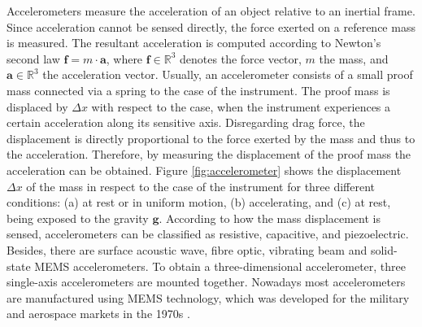Accelerometers measure the acceleration of an object relative to an inertial frame. Since acceleration cannot be sensed directly, the force exerted on a reference mass is measured. The resultant acceleration is computed according to Newton's second law $\mathbf{f} = m \cdot \mathbf{a}$, where $\mathbf{f} \in \mathbb{R}^3$ denotes the force vector, $m$ the mass, and $\mathbf{a} \in \mathbb{R}^3$ the acceleration vector. Usually, an accelerometer consists of a small proof mass connected via a spring to the case of the instrument. The proof mass is displaced  by $\Delta x$ with respect to the case, when the instrument experiences a certain acceleration along its sensitive axis. Disregarding drag force, the displacement is directly proportional to the force exerted by the mass and thus to the acceleration. Therefore, by measuring the displacement of the proof mass the acceleration can be obtained. Figure \ref{fig:accelerometer} shows the displacement $\Delta x$ of the mass in respect to the case of the instrument for three different conditions: (a) at rest or in uniform motion, (b) accelerating, and (c) at rest, being exposed to the gravity $ \mathbf{g}$. According to how the mass displacement is sensed, accelerometers can be classified as resistive, capacitive, and piezoelectric. Besides, there are surface acoustic wave, fibre optic, vibrating beam and solid-state \gls{MEMS} accelerometers. To obtain a three-dimensional accelerometer, three single-axis accelerometers are mounted together. Nowadays most accelerometers are manufactured using MEMS technology, which was developed for the military and aerospace markets in the 1970s \cite{bhattacharyya_inertial_sensors_applications_13}. 

